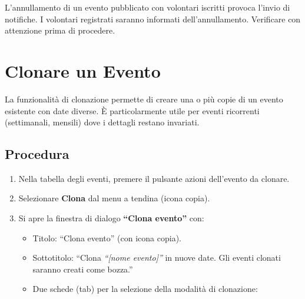 \documentclass[a4paper,11pt,oneside]{book}
\newcommand{\menuitem}[1]{\textsf{\textbf{#1}}}
\begin{document}
\begin{warningbox}
L'annullamento di un evento pubblicato con volontari iscritti provoca l'invio di notifiche. I volontari registrati saranno informati dell'annullamento. Verificare con attenzione prima di procedere.
\end{warningbox}

\section{Clonare un Evento}
\label{sec:clonare-evento}

La funzionalit\`a di clonazione permette di creare una o pi\`u copie di un evento esistente con date diverse. \`E particolarmente utile per eventi ricorrenti (settimanali, mensili) dove i dettagli restano invariati.

\subsection{Procedura}

\begin{enumerate}[leftmargin=1.5em]
  \item Nella tabella degli eventi, premere il pulsante azioni dell'evento da clonare.
  \item Selezionare \menuitem{Clona} dal menu a tendina (icona copia).
  \item Si apre la finestra di dialogo \textbf{``Clona evento''} con:
    \begin{itemize}
      \item Titolo: ``Clona evento'' (con icona copia).
      \item Sottotitolo: ``Clona \textit{``[nome evento]''} in nuove date. Gli eventi clonati saranno creati come bozza.''
      \item Due schede (tab) per la selezione della modalit\`a di clonazione:
    \end{itemize}
\end{enumerate}
\end{document}
